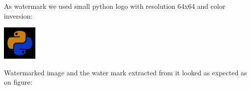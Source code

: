 \documentclass[a4paper, 12pt]{article}
\begin{document}
	\begin{figure}[!h]%
		\centering
		\qquad
		\label{}%
	\end{figure}	

     
    	
        As watermark we used small python logo with resolution 64x64 and color inversion:

        \begin{center}
            \includegraphics[scale=1.5]{watermark.png}
        \end{center}
    	
        Watermarked image and the water mark extracted from it looked as expected as on figure: %
        
        \begin{figure}[!h]%
        	\centering
        	\qquad
        	\label{fig:python_logo}%
        \end{figure}
\end{document}
